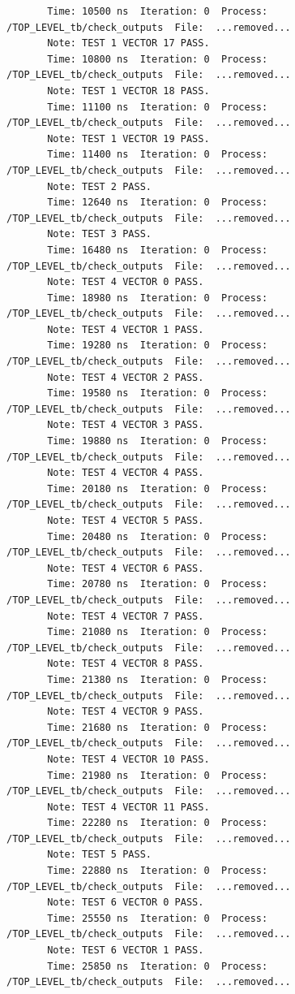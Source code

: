 \documentclass[11pt]{report}
\begin{document}
\begin{verbatim}
       Time: 10500 ns  Iteration: 0  Process: /TOP_LEVEL_tb/check_outputs  File:  ...removed...
       Note: TEST 1 VECTOR 17 PASS.
       Time: 10800 ns  Iteration: 0  Process: /TOP_LEVEL_tb/check_outputs  File:  ...removed...
       Note: TEST 1 VECTOR 18 PASS.
       Time: 11100 ns  Iteration: 0  Process: /TOP_LEVEL_tb/check_outputs  File:  ...removed...
       Note: TEST 1 VECTOR 19 PASS.
       Time: 11400 ns  Iteration: 0  Process: /TOP_LEVEL_tb/check_outputs  File:  ...removed...
       Note: TEST 2 PASS.
       Time: 12640 ns  Iteration: 0  Process: /TOP_LEVEL_tb/check_outputs  File:  ...removed...
       Note: TEST 3 PASS.
       Time: 16480 ns  Iteration: 0  Process: /TOP_LEVEL_tb/check_outputs  File:  ...removed...
       Note: TEST 4 VECTOR 0 PASS.
       Time: 18980 ns  Iteration: 0  Process: /TOP_LEVEL_tb/check_outputs  File:  ...removed...
       Note: TEST 4 VECTOR 1 PASS.
       Time: 19280 ns  Iteration: 0  Process: /TOP_LEVEL_tb/check_outputs  File:  ...removed...
       Note: TEST 4 VECTOR 2 PASS.
       Time: 19580 ns  Iteration: 0  Process: /TOP_LEVEL_tb/check_outputs  File:  ...removed...
       Note: TEST 4 VECTOR 3 PASS.
       Time: 19880 ns  Iteration: 0  Process: /TOP_LEVEL_tb/check_outputs  File:  ...removed...
       Note: TEST 4 VECTOR 4 PASS.
       Time: 20180 ns  Iteration: 0  Process: /TOP_LEVEL_tb/check_outputs  File:  ...removed...
       Note: TEST 4 VECTOR 5 PASS.
       Time: 20480 ns  Iteration: 0  Process: /TOP_LEVEL_tb/check_outputs  File:  ...removed...
       Note: TEST 4 VECTOR 6 PASS.
       Time: 20780 ns  Iteration: 0  Process: /TOP_LEVEL_tb/check_outputs  File:  ...removed...
       Note: TEST 4 VECTOR 7 PASS.
       Time: 21080 ns  Iteration: 0  Process: /TOP_LEVEL_tb/check_outputs  File:  ...removed...
       Note: TEST 4 VECTOR 8 PASS.
       Time: 21380 ns  Iteration: 0  Process: /TOP_LEVEL_tb/check_outputs  File:  ...removed...
       Note: TEST 4 VECTOR 9 PASS.
       Time: 21680 ns  Iteration: 0  Process: /TOP_LEVEL_tb/check_outputs  File:  ...removed...
       Note: TEST 4 VECTOR 10 PASS.
       Time: 21980 ns  Iteration: 0  Process: /TOP_LEVEL_tb/check_outputs  File:  ...removed...
       Note: TEST 4 VECTOR 11 PASS.
       Time: 22280 ns  Iteration: 0  Process: /TOP_LEVEL_tb/check_outputs  File:  ...removed...
       Note: TEST 5 PASS.
       Time: 22880 ns  Iteration: 0  Process: /TOP_LEVEL_tb/check_outputs  File:  ...removed...
       Note: TEST 6 VECTOR 0 PASS.
       Time: 25550 ns  Iteration: 0  Process: /TOP_LEVEL_tb/check_outputs  File:  ...removed...
       Note: TEST 6 VECTOR 1 PASS.
       Time: 25850 ns  Iteration: 0  Process: /TOP_LEVEL_tb/check_outputs  File:  ...removed...

\end{verbatim}
\end{document}
